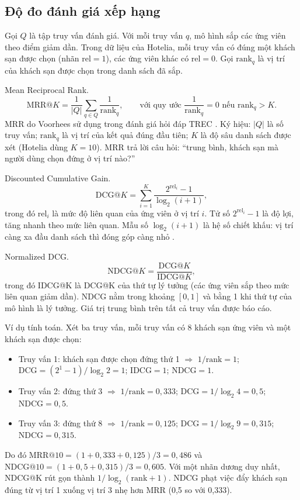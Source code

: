 \subsection{Độ đo đánh giá xếp hạng}\label{sec:metrics}

Gọi $Q$ là tập truy vấn đánh giá. Với mỗi truy vấn $q$, mô hình sắp các ứng viên theo điểm giảm dần. Trong dữ liệu của Hotelia, mỗi truy vấn có đúng một khách sạn được chọn (nhãn $\text{rel} = 1$), các ứng viên khác có $\text{rel} = 0$. Gọi $\text{rank}_q$ là vị trí của khách sạn được chọn trong danh sách đã sắp.

Mean Reciprocal Rank.
\begin{equation}
  \text{MRR@}K = \frac{1}{|Q|} \sum_{q \in Q} \frac{1}{\text{rank}_q},
  \qquad \text{với quy ước } \frac{1}{\text{rank}_q} = 0 \text{ nếu } \text{rank}_q > K.
  \label{eq:mrr}
\end{equation}
MRR do Voorhees sử dụng trong đánh giá hỏi đáp TREC \cite{voorhees1999}. Ký hiệu: $|Q|$ là số truy vấn; $\text{rank}_q$ là vị trí của kết quả đúng đầu tiên; $K$ là độ sâu danh sách được xét (Hotelia dùng $K = 10$). MRR trả lời câu hỏi: ``trung bình, khách sạn mà người dùng chọn đứng ở vị trí nào?''

Discounted Cumulative Gain.
\begin{equation}
  \text{DCG@}K = \sum_{i=1}^{K} \frac{2^{\text{rel}_i} - 1}{\log_2 (i + 1)},
  \label{eq:dcg}
\end{equation}
trong đó $\text{rel}_i$ là mức độ liên quan của ứng viên ở vị trí $i$. Tử số $2^{\text{rel}_i} - 1$ là độ lợi, tăng nhanh theo mức liên quan. Mẫu số $\log_2(i+1)$ là hệ số chiết khấu: vị trí càng xa đầu danh sách thì đóng góp càng nhỏ \cite{jarvelin2002}.

Normalized DCG.
\begin{equation}
  \text{NDCG@}K = \frac{\text{DCG@}K}{\text{IDCG@}K},
  \label{eq:ndcg}
\end{equation}
trong đó IDCG@K là DCG@K của thứ tự lý tưởng (các ứng viên sắp theo mức liên quan giảm dần). NDCG nằm trong khoảng $[0, 1]$ và bằng 1 khi thứ tự của mô hình là lý tưởng. Giá trị trung bình trên tất cả truy vấn được báo cáo.

Ví dụ tính toán. Xét ba truy vấn, mỗi truy vấn có 8 khách sạn ứng viên và một khách sạn được chọn:
\begin{itemize}
\item Truy vấn 1: khách sạn được chọn đứng thứ 1 $\Rightarrow$ $1/\text{rank} = 1$; $\text{DCG} = (2^1 - 1)/\log_2 2 = 1$; $\text{IDCG} = 1$; $\text{NDCG} = 1$.
\item Truy vấn 2: đứng thứ 3 $\Rightarrow$ $1/\text{rank} = 0{,}333$; $\text{DCG} = 1/\log_2 4 = 0{,}5$; $\text{NDCG} = 0{,}5$.
\item Truy vấn 3: đứng thứ 8 $\Rightarrow$ $1/\text{rank} = 0{,}125$; $\text{DCG} = 1/\log_2 9 = 0{,}315$; $\text{NDCG} = 0{,}315$.
\end{itemize}
Do đó $\text{MRR@10} = (1 + 0{,}333 + 0{,}125)/3 = 0{,}486$ và $\text{NDCG@10} = (1 + 0{,}5 + 0{,}315)/3 = 0{,}605$. Với một nhãn dương duy nhất, NDCG@K rút gọn thành $1/\log_2(\text{rank}+1)$. NDCG phạt việc đẩy khách sạn đúng từ vị trí 1 xuống vị trí 3 nhẹ hơn MRR (0,5 so với 0,333).

